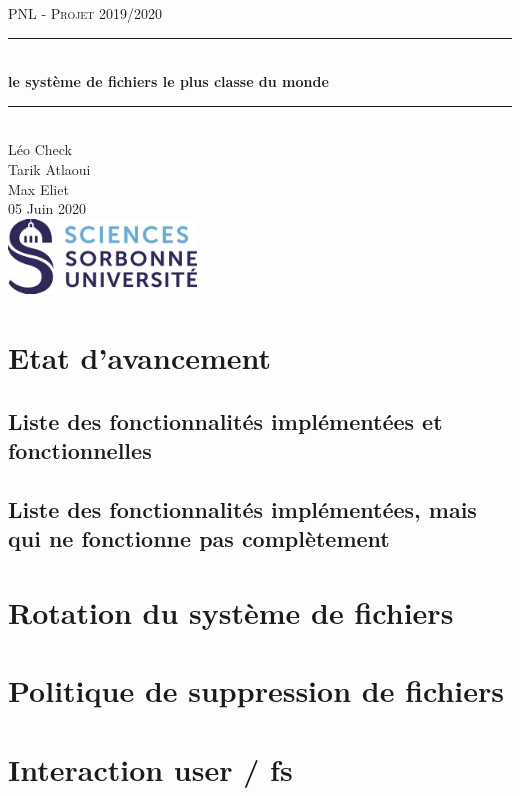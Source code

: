 \documentclass{article}
\date{\today}
\author{Léo Check\\ Tarik Atlaoui \\ Max Eliet}
\begin{document}
\begin{titlepage}
	\enlargethispage{2cm}
	\newcommand{\HRule}{\rule{\linewidth}{0.5mm}}
	\center
	\textsc{\LARGE
	PNL - Projet 2019/2020 
	} \\[1cm]
	\HRule \\[0.4cm]
	{ \huge \bfseries le système de fichiers le plus classe du monde \\[0.15cm] }
	\HRule \\[4cm]
	\large{Léo Check \\[3mm] Tarik Atlaoui \\[3mm] Max Eliet} \\[3cm]
	05 Juin 2020 \\[3cm]
	\hfill \includegraphics[width=5cm]{logoSU.jpg}
\end{titlepage}

	\newpage
	\section{Etat d'avancement}
	\subsection{Liste des fonctionnalités implémentées et fonctionnelles}
	\subsection{Liste des fonctionnalités implémentées, mais qui ne fonctionne pas complètement}
	\section{Rotation du système de fichiers}
	\section{Politique de suppression de fichiers}
	\section{Interaction user / fs}
		
\end{document}
